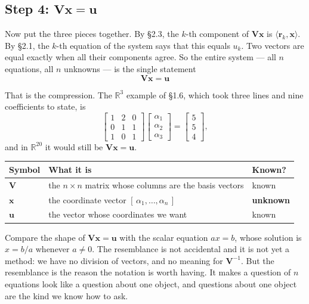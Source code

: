 \documentclass[11pt]{article}
\theoremstyle{plain}
\theoremstyle{definition}
\theoremstyle{remark}
\newcommand{\R}{\mathbb{R}}
\newcommand{\vc}[1]{\mathbf{#1}}        %
\newcommand{\mt}[1]{\mathbf{#1}}        %
\begin{document}
\subsection{Step 4: \texorpdfstring{$\mt{V}\vc{x}=\vc{u}$}{Vx = u}}
Now put the three pieces together. By \S2.3, the $k$-th component of
$\mt{V}\vc{x}$ is $\langle\vc{r}_k,\vc{x}\rangle$. By \S2.1, the $k$-th equation
of the system says that this equals $u_k$. Two vectors are equal exactly when
all their components agree. So the entire system --- all $n$ equations, all $n$
unknowns --- is the single statement
\[
  \boxed{\;\mt{V}\vc{x} = \vc{u}\;}
\]

That is the compression. The $\R^{3}$ example of \S1.6, which took three lines
and nine coefficients to state, is
\[
  \begin{bmatrix}
    1 & 2 & 0 \\
    0 & 1 & 1 \\
    1 & 0 & 1
  \end{bmatrix}
  \begin{bmatrix} \alpha_1 \\ \alpha_2 \\ \alpha_3 \end{bmatrix}
  =
  \begin{bmatrix} 5 \\ 5 \\ 4 \end{bmatrix} ,
\]
and in $\R^{20}$ it would still be $\mt{V}\vc{x}=\vc{u}$.

\begin{center}
\renewcommand{\arraystretch}{1.35}
\begin{tabular}{@{}l l l@{}}
\toprule
\textbf{Symbol} & \textbf{What it is} & \textbf{Known?} \\
\midrule
$\mt{V}$   & the $n\times n$ matrix whose columns are the basis vectors & known \\
$\vc{x}$   & the coordinate vector $[\,\alpha_1,\dots,\alpha_n\,]$      & \textbf{unknown} \\
$\vc{u}$   & the vector whose coordinates we want                       & known \\
\bottomrule
\end{tabular}
\end{center}

\noindent Compare the shape of $\mt{V}\vc{x}=\vc{u}$ with the scalar equation
$ax=b$, whose solution is $x=b/a$ whenever $a\neq0$. The resemblance is not
accidental and it is not yet a method: we have no division of vectors, and no
meaning for $\mt{V}^{-1}$. But the resemblance is the reason the notation is
worth having. It makes a question of $n$ equations look like a question about
one object, and questions about one object are the kind we know how to ask.
\end{document}
